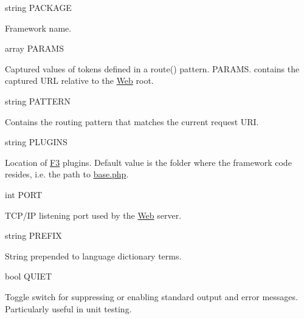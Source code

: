 {\ttfamily string P\+A\+C\+K\+A\+GE}


\begin{DoxyItemize}
\item Framework name.
\end{DoxyItemize}

{\ttfamily array P\+A\+R\+A\+MS}


\begin{DoxyItemize}
\item Captured values of tokens defined in a {\ttfamily route()} pattern. {\ttfamily P\+A\+R\+A\+M\+S.} contains the captured U\+RL relative to the \hyperlink{class_web}{Web} root.
\end{DoxyItemize}

{\ttfamily string P\+A\+T\+T\+E\+RN}


\begin{DoxyItemize}
\item Contains the routing pattern that matches the current request U\+RI.
\end{DoxyItemize}

{\ttfamily string P\+L\+U\+G\+I\+NS}


\begin{DoxyItemize}
\item Location of \hyperlink{class_f3}{F3} plugins. Default value is the folder where the framework code resides, i.\+e. the path to {\ttfamily \hyperlink{base_8php_source}{base.\+php}}.
\end{DoxyItemize}

{\ttfamily int P\+O\+RT}


\begin{DoxyItemize}
\item T\+C\+P/\+IP listening port used by the \hyperlink{class_web}{Web} server.
\end{DoxyItemize}

{\ttfamily string P\+R\+E\+F\+IX}


\begin{DoxyItemize}
\item String prepended to language dictionary terms.
\end{DoxyItemize}

{\ttfamily bool Q\+U\+I\+ET}


\begin{DoxyItemize}
\item Toggle switch for suppressing or enabling standard output and error messages. Particularly useful in unit testing.
\end{DoxyItemize}

